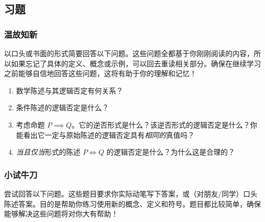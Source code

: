 \subsection{习题}

\subsubsection*{温故知新}

以口头或书面的形式简要回答以下问题。这些问题全都基于你刚刚阅读的内容，所以如果忘记了具体的定义、概念或示例，可以回去重读相关部分。确保在继续学习之前能够自信地回答这些问题，这将有助于你的理解和记忆！

\begin{enumerate}[label=(\arabic*)]
    \item 数学陈述与其逻辑否定有何关系？
    \item 条件陈述的逻辑否定是什么？
    \item 考虑命题 $P \implies Q$。它的逆否形式是什么？该逆否形式的逻辑否定是什么？你能看出它一定与原始陈述的逻辑否定具有\emph{相同的}真值吗？
    \item \emph{当且仅当}形式的陈述 $P \iff Q$ 的逻辑否定是什么？为什么这是合理的？
\end{enumerate}

\subsubsection*{小试牛刀}

尝试回答以下问题。这些题目要求你实际动笔写下答案，或（对朋友/同学）口头陈述答案。目的是帮助你练习使用新的概念、定义和符号。题目都比较简单，确保能够解决这些问题将对你大有帮助！

